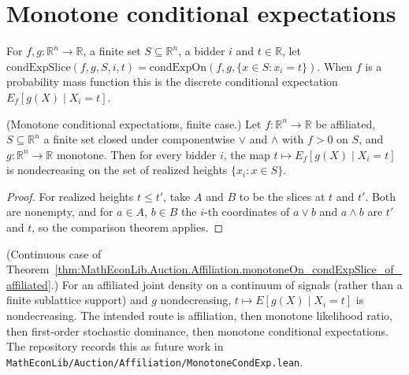 \section{Monotone conditional expectations}

\begin{definition}\label{def:MathEconLib.Auction.Affiliation.condExpSlice}
\leanok
{}
For $f, g : \mathbb{R}^n \to \mathbb{R}$, a finite set $S \subseteq \mathbb{R}^n$, a bidder $i$ and $t \in \mathbb{R}$, let $\mathrm{condExpSlice}(f, g, S, i, t) = \mathrm{condExpOn}(f, g, \{x \in S : x_i = t\})$. When $f$ is a probability mass function this is the discrete conditional expectation $E_f[g(X) \mid X_i = t]$.
\end{definition}

\begin{theorem}\label{thm:MathEconLib.Auction.Affiliation.monotoneOn_condExpSlice_of_affiliated}
\leanok
{}
(Monotone conditional expectations, finite case.) Let $f : \mathbb{R}^n \to \mathbb{R}$ be affiliated, $S \subseteq \mathbb{R}^n$ a finite set closed under componentwise $\vee$ and $\wedge$ with $f > 0$ on $S$, and $g : \mathbb{R}^n \to \mathbb{R}$ monotone. Then for every bidder $i$, the map $t \mapsto E_f[g(X) \mid X_i = t]$ is nondecreasing on the set of realized heights $\{x_i : x \in S\}$.
\end{theorem}

\begin{proof}
\leanok
{}
For realized heights $t \le t'$, take $A$ and $B$ to be the slices at $t$ and $t'$. Both are nonempty, and for $a \in A$, $b \in B$ the $i$-th coordinates of $a \vee b$ and $a \wedge b$ are $t'$ and $t$, so the comparison theorem applies.
\end{proof}

\begin{theorem}\label{thm:open.monotone_condexp_continuous}
(Continuous case of Theorem~\ref{thm:MathEconLib.Auction.Affiliation.monotoneOn_condExpSlice_of_affiliated}.) For an affiliated joint density on a continuum of signals (rather than a finite sublattice support) and $g$ nondecreasing, $t \mapsto E[g(X) \mid X_i = t]$ is nondecreasing. The intended route is affiliation, then monotone likelihood ratio, then first-order stochastic dominance, then monotone conditional expectations. The repository records this as future work in \texttt{MathEconLib/Auction/Affiliation/MonotoneCondExp.lean}.
\end{theorem}

